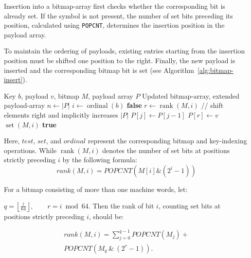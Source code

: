 \documentclass[11pt,twoside]{article}
\begin{document}
    Insertion into a bitmap-array first checks whether the corresponding
    bit is already set. If the symbol is not present, the number of set bits
    preceding its position, calculated using \texttt{POPCNT}, determines the
    insertion position in the payload array.

    To maintain the ordering of payloads, existing entries starting from
    the insertion position must be shifted one position to the right.
    Finally, the new payload is inserted and the corresponding bitmap
    bit is set (see Algorithm~\ref{alg:bitmap-insert}).

    \bigskip


    \begin{algorithm}
        \caption{Insert into bitmap-array}
        \label{alg:bitmap-insert}
        \begin{algorithmic}[1]
\Require Key $b$, payload $v$, bitmap $M$, payload array $P$
\Ensure Updated bitmap-array, extended payload-array
\State $n \gets |P|$
\State $i \gets \operatorname{ordinal}(b)$
    \State \Return \textbf{false}
\EndIf
\State $r \gets \operatorname{rank}(M,i)$
\State // shift elements right and implicitly increases $|P|$
    \State $P[j] \gets P[j-1]$
\EndFor
\State $P[r] \gets v$
\State $\operatorname{set}(M,i)$
\State \Return \textbf{true}
        \end{algorithmic}
    \end{algorithm}

    Here, \(test\),  \(set\), and \(ordinal\) represent the corresponding bitmap
    and key-indexing operations. While $\operatorname{rank}(M,i)$ denotes the number of set bits at
    positions strictly preceding $i$ by the following formula:
        \begin{equation}
        rank(M, i)= POPCNT(M[i] \& (2^i - 1))
        \end{equation}

    \bigskip
    For a bitmap consisting of more than one machine words, let:

    \(
    q=\left\lfloor\frac{i}{64}\right\rfloor,
    \qquad
    r=i\bmod64.
    \)
    Then the rank of bit \(i\), counting set bits at positions strictly preceding \(i\), should be:

\begin{equation}
    \begin{aligned}
            rank(M,i) = \sum_{j=0}^{q-1} POPCNT(M_j) + \\
            POPCNT\left(M_q\ \&\ (2^r-1)\right).
    \end{aligned}
\end{equation}
\end{document}
